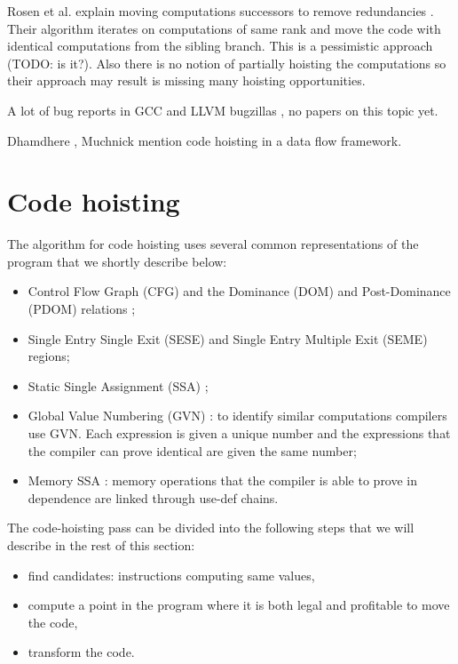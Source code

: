\documentclass{sig-alternate}
\begin{document}
Rosen et al. explain moving computations successors to remove redundancies
\cite{rosen1988global}. Their algorithm iterates on computations of same rank
and move the code with identical computations from the sibling branch. This is a
pessimistic approach (TODO: is it?). Also there is no notion of partially
hoisting the computations so their approach may result is missing many hoisting
opportunities.

A lot of bug reports in GCC and LLVM bugzillas
\cite{GCCCodeHoistingBugs,LLVMCodeHoistingBugs}, no papers on this topic yet.

Dhamdhere \cite{dhamdhere1988fast}, Muchnick \cite{steven1997advanced} mention
code hoisting in a data flow framework.


\newpage

\section{Code hoisting}

The algorithm for code hoisting uses several common representations of the
program that we shortly describe below:
\begin{itemize}
\item Control Flow Graph (CFG) and the Dominance (DOM) and Post-Dominance (PDOM)
  relations \cite{dragonbook};
\item Single Entry Single Exit (SESE) \cite{sese} and Single Entry Multiple Exit
  (SEME) regions;
\item Static Single Assignment (SSA) \cite{cytron};
\item Global Value Numbering (GVN) \cite{rosen1988global,click1995global}: to
  identify similar computations compilers use GVN.  Each expression is given a
  unique number and the expressions that the compiler can prove identical are
  given the same number;
\item Memory SSA \cite{novillo2007memory}: memory operations that the compiler
  is able to prove in dependence are linked through use-def chains.
\end{itemize}

The code-hoisting pass can be divided into the following steps that we will
describe in the rest of this section:
\begin{itemize}
\item find candidates: instructions computing same values,
\item compute a point in the program where it is both legal and profitable to
  move the code,
\item transform the code.
\end{itemize}
\end{document}
